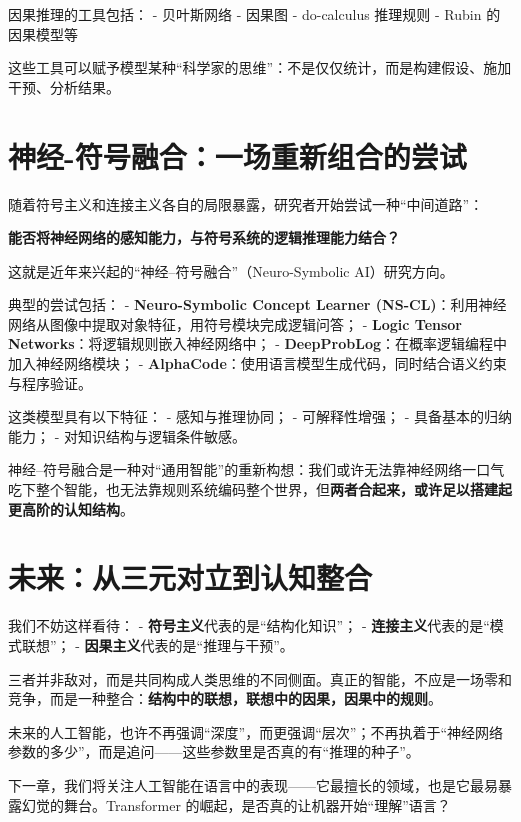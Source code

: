 因果推理的工具包括：
- 贝叶斯网络
- 因果图
- do-calculus 推理规则
- Rubin 的因果模型等

这些工具可以赋予模型某种“科学家的思维”：不是仅仅统计，而是构建假设、施加干预、分析结果。

\section*{神经-符号融合：一场重新组合的尝试}

随着符号主义和连接主义各自的局限暴露，研究者开始尝试一种“中间道路”：

\textbf{能否将神经网络的感知能力，与符号系统的逻辑推理能力结合？}

这就是近年来兴起的“神经–符号融合”（Neuro-Symbolic AI）研究方向。

典型的尝试包括：
- \textbf{Neuro-Symbolic Concept Learner (NS-CL)}：利用神经网络从图像中提取对象特征，用符号模块完成逻辑问答；
- \textbf{Logic Tensor Networks}：将逻辑规则嵌入神经网络中；
- \textbf{DeepProbLog}：在概率逻辑编程中加入神经网络模块；
- \textbf{AlphaCode}：使用语言模型生成代码，同时结合语义约束与程序验证。

这类模型具有以下特征：
- 感知与推理协同；
- 可解释性增强；
- 具备基本的归纳能力；
- 对知识结构与逻辑条件敏感。

神经–符号融合是一种对“通用智能”的重新构想：我们或许无法靠神经网络一口气吃下整个智能，也无法靠规则系统编码整个世界，但\textbf{两者合起来，或许足以搭建起更高阶的认知结构}。

\section*{未来：从三元对立到认知整合}

我们不妨这样看待：
- \textbf{符号主义}代表的是“结构化知识”；
- \textbf{连接主义}代表的是“模式联想”；
- \textbf{因果主义}代表的是“推理与干预”。

三者并非敌对，而是共同构成人类思维的不同侧面。真正的智能，不应是一场零和竞争，而是一种整合：\textbf{结构中的联想，联想中的因果，因果中的规则}。

未来的人工智能，也许不再强调“深度”，而更强调“层次”；不再执着于“神经网络参数的多少”，而是追问——这些参数里是否真的有“推理的种子”。

下一章，我们将关注人工智能在语言中的表现——它最擅长的领域，也是它最易暴露幻觉的舞台。Transformer 的崛起，是否真的让机器开始“理解”语言？

\nocite{*}
\printbibliography[heading=bibintoc, title=\ebibname]

\newpage
